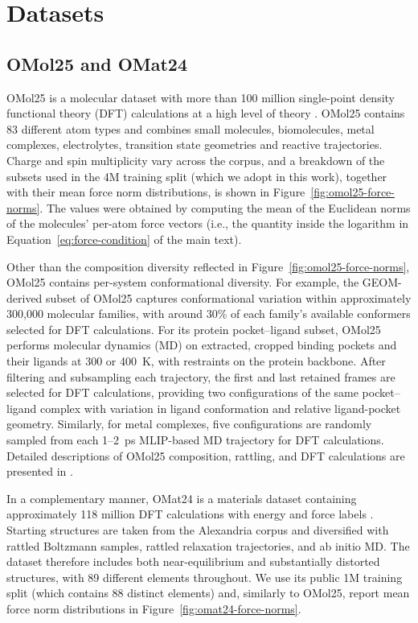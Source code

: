 \documentclass{article} %
\begin{document}
\section{Datasets}
\label{app:datasets}

\subsection{OMol25 and OMat24}

OMol25 is a molecular dataset with more than 100 million single-point density functional theory (DFT) calculations at a high level of theory \citep{levine2025omol25}. OMol25 contains 83 different atom types and combines small molecules, biomolecules, metal complexes, electrolytes, transition state geometries and reactive trajectories. Charge and spin multiplicity vary across the corpus, and a breakdown of the subsets used in the 4M training split (which we adopt in this work), together with their mean force norm distributions, is shown in Figure~\ref{fig:omol25-force-norms}. The values were obtained by computing the mean of the Euclidean norms of the molecules' per-atom force vectors (i.e., the quantity inside the logarithm in Equation~\ref{eq:force-condition} of the main text). 

Other than the composition diversity reflected in Figure~\ref{fig:omol25-force-norms}, OMol25 contains per-system conformational diversity. For example, the GEOM-derived subset of OMol25 captures conformational variation within approximately 300{,}000 molecular families, with around 30\% of each family's available conformers selected for DFT calculations. For its protein pocket--ligand subset, OMol25 performs molecular dynamics (MD) on extracted, cropped binding pockets and their ligands at 300 or 400~K, with restraints on the protein backbone. After filtering and subsampling each trajectory, the first and last retained frames are selected for DFT calculations, providing two configurations of the same pocket--ligand complex with variation in ligand conformation and relative ligand-pocket geometry. Similarly, for metal complexes, five configurations are randomly sampled from each 1--2~ps MLIP-based MD trajectory for DFT calculations. Detailed descriptions of OMol25 composition, rattling, and DFT calculations are presented in \citet{levine2025omol25}.

In a complementary manner, OMat24 is a materials dataset containing approximately 118 million DFT calculations with energy and force labels \citep{barrosoluque2024omat24}. Starting structures are taken from the Alexandria corpus and diversified with rattled Boltzmann samples, rattled relaxation trajectories, and ab initio MD. The dataset therefore includes both near-equilibrium and substantially distorted structures, with 89 different elements throughout. We use its public 1M training split (which contains 88 distinct elements) and, similarly to OMol25, report mean force norm distributions in Figure~\ref{fig:omat24-force-norms}.
\end{document}
